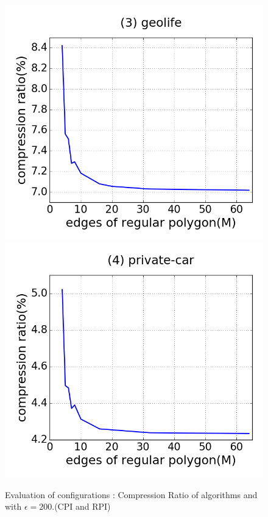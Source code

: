 \begin{figure}[tb!]
\includegraphics[scale = 0.250]{figures/Exp-M-cr-geolife.png}
\includegraphics[scale = 0.250]{figures/Exp-M-cr-private.png}
\vspace{-2ex}
\caption{\small Evaluation of configurations : Compression Ratio of algorithms \cist and \cista with $\epsilon = 200$.(CPI and RPI)}
\label{fig:m-cr-e200}
\vspace{-1ex}
\end{figure}


